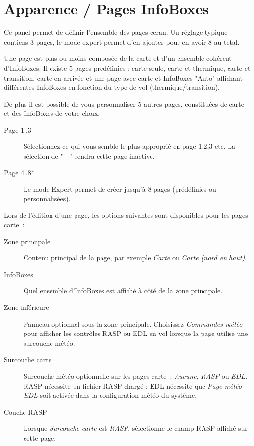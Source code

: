 \section{Apparence / Pages InfoBoxes}\label{conf:screenpages}

Ce panel permet de définir l'ensemble des pages écran. Un réglage typique contiens 3 pages, le mode expert permet d'en ajouter pour en avoir 8 au total.

Une page est plus ou moins composée de la carte et d'un ensemble cohérent d'InfoBoxes.  Il existe 5 pages prédéfinies : carte seule, carte et thermique, carte et transition, carte en arrivée et une page avec carte et InfoBoxes "Auto" affichant différentes InfoBoxes en fonction du type de vol (thermique/transition).

De plus il est possible de vous personnaliser 5 autres pages, constituées de carte et des InfoBoxes de votre choix. 

\begin{description}
\item[Page 1..3]  Sélectionnez ce qui vous semble le plus approprié en page 1,2,3 etc. La sélection de "---" rendra cette page inactive.
\item[Page 4..8*] Le mode Expert permet de créer jusqu'à 8 pages (prédéfinies ou personnalisées).
\end{description}

Lors de l'édition d'une page, les options suivantes sont disponibles pour
les pages carte~:
\begin{description}
\item[Zone principale]
  Contenu principal de la page, par exemple \emph{Carte} ou \emph{Carte
  (nord en haut)}.
\item[InfoBoxes]
  Quel ensemble d'InfoBoxes est affiché à côté de la zone principale.
\item[Zone inférieure]
  Panneau optionnel sous la zone principale.  Choisissez \emph{Commandes
  météo} pour afficher les contrôles RASP ou EDL en vol lorsque la page
  utilise une surcouche météo.
\item[Surcouche carte]
  Surcouche météo optionnelle sur les pages carte~: \emph{Aucune},
  \emph{RASP} ou \emph{EDL}.  RASP nécessite un fichier RASP chargé ; EDL
  nécessite que \emph{Page météo EDL} soit activée dans la configuration
  météo du système.
\item[Couche RASP]
  Lorsque \emph{Surcouche carte} est \emph{RASP}, sélectionne le champ
  RASP affiché sur cette page.
\end{description}


